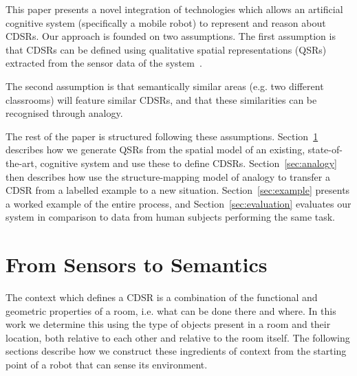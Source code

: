 \documentclass[letterpaper]{article}
\begin{document}

This paper presents a novel integration of technologies which allows an artificial cognitive system (specifically a mobile robot) to represent and reason about CDSRs. Our approach is founded on two assumptions. The first assumption is that CDSRs can be defined using qualitative spatial representations (QSRs) extracted from the sensor data of the system~\cite{Cohn:2001}. 

The second assumption is that semantically similar areas (e.g. two different classrooms) will feature similar CDSRs, and that these similarities can be recognised through analogy. 

The rest of the paper is structured following these assumptions. Section~\ref{sec:qsr-gen} describes how we generate QSRs from the spatial model of an existing, state-of-the-art, cognitive system and use these to define CDSRs. Section~\ref{sec:analogy} then describes how use the structure-mapping model of analogy \cite{Gentner1983a} to transfer a CDSR from a labelled example to a new situation. Section~\ref{sec:example} presents a worked example of the entire process, and Section~\ref{sec:evaluation} evaluates our system in comparison to data from human subjects performing the same task.


\section{From Sensors to Semantics}\label{sec:qsr-gen}


The context which defines a CDSR is a combination of the functional and geometric properties of a room, i.e. what can be done there and where. In this work we determine this using the type of objects present in a room and their location, both relative to each other and relative to the room itself. The following sections describe how we construct these ingredients of context from the starting point of a robot that can sense its environment. 
\end{document}
